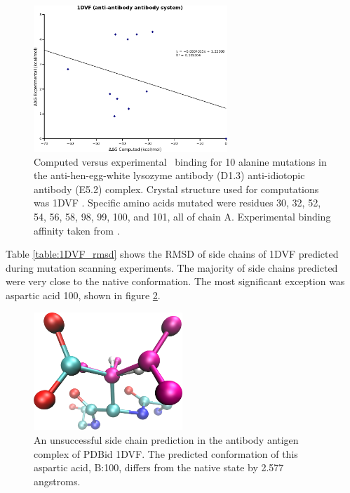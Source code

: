 \begin{figure}[h]
    \centering
    \includegraphics[width=0.65\textwidth]{figures/1dvf.png}
    \caption{Computed versus experimental \ddg\ binding for 10 alanine mutations in the anti-hen-egg-white lysozyme antibody (D1.3) anti-idiotopic antibody (E5.2) complex.
    Crystal structure used for computations was 1DVF \protect\cite{braden1996crystal}.
    Specific amino acids mutated were residues 30, 32, 52, 54, 56, 58, 98, 99, 100, and 101, all of chain A.
    Experimental binding affinity taken from \protect\cite{thorn2001asedb}.}
    \label{figure:computational_mutation_scanning/1DVF_ddg}
\end{figure}



Table \ref{table:1DVF_rmsd} shows the RMSD of side chains of 1DVF predicted during mutation scanning experiments.
The majority of side chains predicted were very close to the native conformation.
The most significant exception was aspartic acid 100, shown in figure \ref{figure:computational_mutation_scanning/1DVF_b_100}.


\begin{figure}[h]
    \centering
    \includegraphics[width=0.5\textwidth,height=0.2\textheight,keepaspectratio]{figures/mutation_side_chain_images/1dvf_chain_b_100.png}
    \caption{An unsuccessful side chain prediction in the antibody antigen complex of PDBid 1DVF.  
    The predicted conformation of this aspartic acid, B:100, differs from the native state by 2.577 angstroms.}
    \label{figure:computational_mutation_scanning/1DVF_b_100}
\end{figure}

